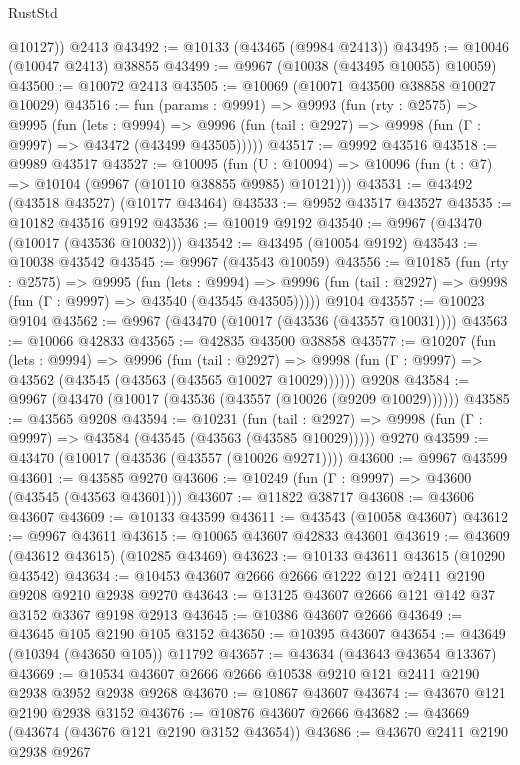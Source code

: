\begin{lexlean}{RustStd}
\begin{coremodule}
        @10127))
    @2413
@43492 := @10133 (@43465 (@9984 @2413))
@43495 := @10046 (@10047 @2413) @38855
@43499 := @9967 (@10038 (@43495 @10055) @10059)
@43500 := @10072 @2413
@43505 := @10069 (@10071 @43500 @38858 @10027 @10029)
@43516 := fun (params : @9991) =>
  @9993
    (fun (rty : @2575) =>
    @9995
      (fun (lets : @9994) =>
      @9996 (fun (tail : @2927) => @9998 (fun (Γ : @9997) => @43472 (@43499 @43505)))))
@43517 := @9992 @43516
@43518 := @9989 @43517
@43527 := @10095
    (fun (U : @10094) => @10096 (fun (t : @7) => @10104 (@9967 (@10110 @38855 @9985) @10121)))
@43531 := @43492 (@43518 @43527) (@10177 @43464)
@43533 := @9952 @43517 @43527
@43535 := @10182 @43516 @9192
@43536 := @10019 @9192
@43540 := @9967 (@43470 (@10017 (@43536 @10032)))
@43542 := @43495 (@10054 @9192)
@43543 := @10038 @43542
@43545 := @9967 (@43543 @10059)
@43556 := @10185
    (fun (rty : @2575) =>
    @9995
      (fun (lets : @9994) =>
      @9996 (fun (tail : @2927) => @9998 (fun (Γ : @9997) => @43540 (@43545 @43505)))))
    @9104
@43557 := @10023 @9104
@43562 := @9967 (@43470 (@10017 (@43536 (@43557 @10031))))
@43563 := @10066 @42833
@43565 := @42835 @43500 @38858
@43577 := @10207
    (fun (lets : @9994) =>
    @9996
      (fun (tail : @2927) =>
      @9998 (fun (Γ : @9997) => @43562 (@43545 (@43563 (@43565 @10027 @10029))))))
    @9208
@43584 := @9967 (@43470 (@10017 (@43536 (@43557 (@10026 (@9209 @10029))))))
@43585 := @43565 @9208
@43594 := @10231
    (fun (tail : @2927) => @9998 (fun (Γ : @9997) => @43584 (@43545 (@43563 (@43585 @10029)))))
    @9270
@43599 := @43470 (@10017 (@43536 (@43557 (@10026 @9271))))
@43600 := @9967 @43599
@43601 := @43585 @9270
@43606 := @10249 (fun (Γ : @9997) => @43600 (@43545 (@43563 @43601)))
@43607 := @11822 @38717
@43608 := @43606 @43607
@43609 := @10133 @43599
@43611 := @43543 (@10058 @43607)
@43612 := @9967 @43611
@43615 := @10065 @43607 @42833 @43601
@43619 := @43609 (@43612 @43615) (@10285 @43469)
@43623 := @10133 @43611 @43615 (@10290 @43542)
@43634 := @10453 @43607 @2666 @2666 @1222 @121 @2411 @2190 @9208 @9210 @2938 @9270
@43643 := @13125 @43607 @2666 @121 @142 @37 @3152 @3367 @9198 @2913
@43645 := @10386 @43607 @2666
@43649 := @43645 @105 @2190 @105 @3152
@43650 := @10395 @43607
@43654 := @43649 (@10394 (@43650 @105)) @11792
@43657 := @43634 (@43643 @43654 @13367)
@43669 := @10534 @43607 @2666 @2666 @10538 @9210 @121 @2411 @2190 @2938 @3952 @2938 @9268
@43670 := @10867 @43607
@43674 := @43670 @121 @2190 @2938 @3152
@43676 := @10876 @43607 @2666
@43682 := @43669 (@43674 (@43676 @121 @2190 @3152 @43654))
@43686 := @43670 @2411 @2190 @2938 @9267

\end{coremodule}
\end{lexlean}
